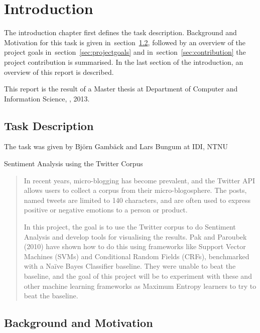 \chapter{Introduction}

The introduction chapter first defines the task description. Background and Motivation for this task is given in~section~\ref{sec:motivation}, followed by an overview of the project goals in~section~\ref{sec:projectgoals} and in~section~\ref{sec:contribution} the project contribution is summarised. In the last section of the introduction, an overview of this report is described. 

This report is the result of a Master thesis at Department of Computer and Information Science, , 2013. 

\section{Task Description}
\label{sec:task}

The task was given by Bj\"{o}rn Gamb\"{a}ck and Lars Bungum at IDI, NTNU

\begin{center} \Large Sentiment Analysis using the Twitter Corpus \end{center}
\begin{quotation}
In recent years, micro-blogging has become prevalent, and the Twitter API allows users to collect a corpus from their micro-blogosphere. The posts, named tweets are limited to 140 characters, and are often used to express positive or negative emotions to a person or product.

In this project, the goal is to use the Twitter corpus to do Sentiment Analysis and develop tools for visualising the results. Pak and Paroubek (2010) have shown how to do this using frameworks like Support Vector Machines (SVMs) and Conditional Random Fields (CRFs), benchmarked with a Na\"{i}ve Bayes Classifier baseline. They were unable to beat the baseline, and the goal of this project will be to experiment with these and other machine learning frameworks as Maximum Entropy learners to try to beat the baseline.
\end{quotation}


\section{Background and Motivation}
\label{sec:motivation}

